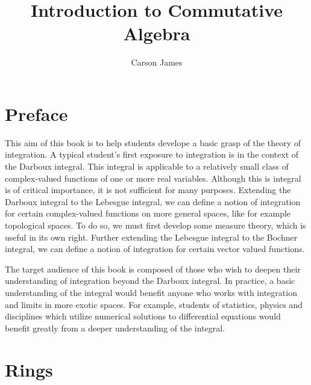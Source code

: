 \documentclass[12pt]{amsart}
\theoremstyle{definition}
\theoremstyle{remark}
\theoremstyle{definition}
\begin{document}
	
	\title{Introduction to Commutative Algebra}
	\author{Carson James}
	\maketitle
	
	\tableofcontents
	
	\newpage
	
	\section*{Preface}
	\begin{flushleft}
		This aim of this book is to help students develope a basic grasp of the theory of integration. A typical student's first exposure to integration is in the context of the Darboux integral. This integral is applicable to a relatively small class of complex-valued functions of one or more real variables. Although this is integral is of critical importance, it is not sufficient for many purposes. Extending the Darboux integral to the Lebesgue integral, we can define a notion of integration for certain complex-valued functions on more general spaces, like for example topological spaces. To do so, we must first develop some measure theory, which is useful in its own right. Further extending the Lebesgue integral to the Bochner integral, we can define a notion of integration for certain vector valued functions. 
	\end{flushleft}

	\vspace{.2cm}

	\begin{flushleft}
		The target audience of this book is composed of those who wish to deepen their understanding of integration beyond the Darboux integral. In practice, a basic understanding of the integral would benefit anyone who works with integration and limits in more exotic spaces. For example, students of statistics, physics and disciplines which utilize numerical solutions to differential equations would benefit greatly from a deeper understanding of the integral. 
	\end{flushleft}
	
	
	\newpage
	
	\section{Rings}
	
\end{document}
